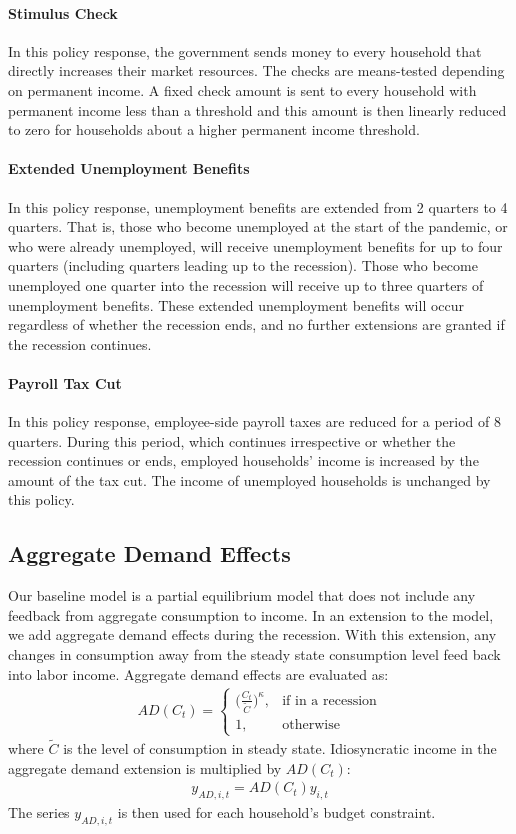 \documentclass[11pt]{article}
\begin{document}
	\paragraph{Stimulus Check} In this policy response, the government sends money to every household that directly increases their market resources. The checks are means-tested depending on permanent income. A fixed check amount is sent to every household with permanent income less than a threshold and this amount is then linearly reduced to zero for households about a higher permanent income threshold.
	
	\paragraph{Extended Unemployment Benefits} In this policy response, unemployment benefits are extended from 2 quarters to 4 quarters. That is, those who become unemployed at the start of the pandemic, or who were already unemployed, will receive unemployment benefits for up to four quarters (including quarters leading up to the recession). Those who become unemployed one quarter into the recession will receive up to three quarters of unemployment benefits. These extended unemployment benefits will occur regardless of whether the recession ends, and no further extensions are granted if the recession continues.
	
	\paragraph{Payroll Tax Cut} In this policy response, employee-side payroll taxes are reduced for a period of 8 quarters. During this period, which continues irrespective or whether the recession continues or ends, employed households' income is increased by the amount of the tax cut. The income of unemployed households is unchanged by this policy.
	
	\subsection{Aggregate Demand Effects}
	Our baseline model is a partial equilibrium model that does not include any feedback from aggregate consumption to income. In an extension to the model, we add aggregate demand effects during the recession. With this extension, any changes in consumption away from the steady state consumption level feed back into labor income. Aggregate demand effects are evaluated as:
	\begin{align}
	AD(C_t) =   \begin{cases}
				\Big(\frac{C_t}{\tilde{C}}\Big)^\kappa, & \text{if in a recession} \\
				1, & \text{otherwise} 
				\end{cases}
	\end{align}
	where $\tilde{C}$ is the level of consumption in steady state. Idiosyncratic income in the aggregate demand extension is multiplied by $AD(C_t)$:
	\begin{align}
	y_{AD,i,t} = AD(C_t)y_{i,t}
	\end{align}
	The series $y_{AD,i,t}$ is then used for each household's budget constraint.
\end{document}

